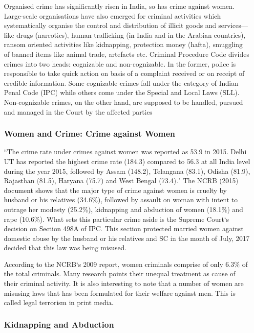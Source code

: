 \documentclass{article}
\begin{document}
Organised crime has significantly risen in India, so has crime against women. Large-scale organisations have also emerged for criminal activities which systematically organise the control and distribution of illicit goods and services—like drugs (narcotics), human trafficking (in India and in the Arabian countries), ransom oriented activities like kidnapping, protection money (hafta), smuggling of banned items like animal trade, artefacts etc. Criminal Procedure Code divides crimes into two heads: cognizable and non-cognizable. In the former, police is responsible to take quick action on basis of a complaint received or on receipt of credible information. Some cognizable crimes fall under the category of Indian Penal Code (IPC) while others come under the Special and Local Laws (SLL). Non-cognizable crimes, on the other hand, are supposed to be handled, pursued and managed in the Court by the affected parties

\subsubsection*{Women and Crime: Crime against Women}

“The crime rate under crimes against women was reported as 53.9 in 2015. Delhi UT has reported the highest crime rate (184.3) compared to 56.3 at all India level during the year 2015, followed by Assam (148.2), Telangana (83.1), Odisha (81.9), Rajasthan (81.5), Haryana (75.7) and West Bengal (73.4)." The NCRB (2015) document shows that the major type of crime against women is cruelty by husband or his relatives (34.6\%), followed by assault on woman with intent to outrage her modesty (25.2\%), kidnapping and abduction of women (18.1\%) and rape (10.6\%). What sets this particular crime aside is the Supreme Court‘s decision on Section 498A of IPC. This section protected married women against domestic abuse by the husband or his relatives and SC in the month of July, 2017 decided that this law was being misused.


According to the NCRB‘s 2009 report, women criminals comprise of only 6.3\% of the total criminals. Many research points their unequal treatment as cause of their criminal activity. It is also interesting to note that a number of women are misusing laws that has been formulated for their welfare against men. This is called legal terrorism in print media.

\subsubsection*{Kidnapping and Abduction}
\end{document}
